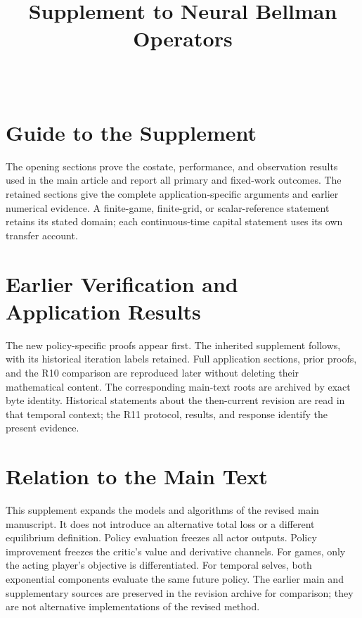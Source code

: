 \documentclass[ecta,nameyear,draft]{econsocart}
\theoremstyle{definition}
\theoremstyle{remark}
\begin{document}
\begin{frontmatter}
\title{Supplement to Neural Bellman Operators}
\begin{aug}
\author[id=au1,addressref={add1}]{~}
\address[id=add1]{Peking University}
\end{aug}
\end{frontmatter}

\section{Guide to the Supplement}
The opening sections prove the costate, performance, and observation results used in the main article and report all primary and fixed-work outcomes. The retained sections give the complete application-specific arguments and earlier numerical evidence. A finite-game, finite-grid, or scalar-reference statement retains its stated domain; each continuous-time capital statement uses its own transfer account.







\section{Earlier Verification and Application Results}
The new policy-specific proofs appear first. The inherited supplement follows, with its historical iteration labels retained. Full application sections, prior proofs, and the R10 comparison are reproduced later without deleting their mathematical content. The corresponding main-text roots are archived by exact byte identity. Historical statements about the then-current revision are read in that temporal context; the R11 protocol, results, and response identify the present evidence.

\section{Relation to the Main Text}
This supplement expands the models and algorithms of the revised main manuscript. It does not introduce an alternative total loss or a different equilibrium definition. Policy evaluation freezes all actor outputs. Policy improvement freezes the critic's value and derivative channels. For games, only the acting player's objective is differentiated. For temporal selves, both exponential components evaluate the same future policy. The earlier main and supplementary sources are preserved in the revision archive for comparison; they are not alternative implementations of the revised method.
\end{document}
